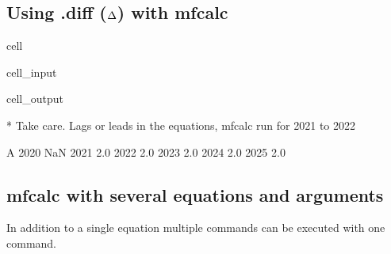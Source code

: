 \documentclass[letterpaper,10pt,english]{jupyterBook}
\begin{document}
\subsection{Using .diff (\protect\(\Delta\protect\)) with mfcalc}
\label{\detokenize{content/04_PythonEssentials/ExtendingDataFrames:using-diff-delta-with-mfcalc}}
\begin{sphinxuseclass}{cell}\begin{sphinxVerbatimInput}

\begin{sphinxuseclass}{cell_input}
\begin{sphinxVerbatim}[commandchars=\\\{\}]
   
                      
\end{sphinxVerbatim}

\end{sphinxuseclass}\end{sphinxVerbatimInput}
\begin{sphinxVerbatimOutput}

\begin{sphinxuseclass}{cell_output}
\begin{sphinxVerbatim}[commandchars=\\\{\}]
* Take care. Lags or leads in the equations, mfcalc run for 2021 to 2022
\end{sphinxVerbatim}

\begin{sphinxVerbatim}[commandchars=\\\{\}]
        A
2020  NaN
2021  2.0
2022  2.0
2023  2.0
2024  2.0
2025  2.0
\end{sphinxVerbatim}

\end{sphinxuseclass}\end{sphinxVerbatimOutput}

\end{sphinxuseclass}

\subsection{mfcalc with several equations and arguments}
\label{\detokenize{content/04_PythonEssentials/ExtendingDataFrames:mfcalc-with-several-equations-and-arguments}}
\sphinxAtStartPar
In addition to a single equation multiple commands can be executed with one command.
\end{document}
